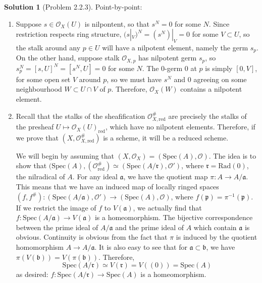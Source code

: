\documentclass[aps,pra,showpacs,notitlepage,onecolumn,superscriptaddress,nofootinbib]{revtex4-1}
\theoremstyle{definition}
\newtheorem{solution}{Solution}[section]
\begin{document}
\begin{solution}[Problem 2.2.3]
  Point-by-point:
  \begin{enumerate}
    \item Suppose $s \in \mathcal{O}_X(U)$ is nilpontent, so that $s^N = 0$ for some $N$. Since restriction respects ring structure, $(s|_V)^N = (s^N)|_V = 0$ for some $V \subset U$,
      so the stalk around any $p \in U$ will have a nilpotent element, namely the germ $s_p$. On the other hand, suppose stalk $\mathcal{O}_{X, p}$ has nilpotent germ $s_p$, so
      $s_p^N = [s, U]^N = [s^N, U] = 0$ for some $N$. The $0$-germ $0$ at $p$ is simply $[0, V]$, for some open set $V$ around $p$, so we must have $s^N$ and $0$ agreeing on some neighbourhood
      $W \subset U \cap V$ of $p$. Therefore, $\mathcal{O}_X(W)$ contains a nilpotent element.
      \item Recall that the stalks of the sheafification $\mathcal{O}_{X, \text{red}}^{\#}$ are precisely the stalks of the presheaf $U \mapsto \mathcal{O}_X(U)_{\text{red}}$, which have no nilpotent elements.
        Therefore, if we prove that $(X, \mathcal{O}_{X, \text{red}}^{\#})$ is a scheme, it will be a reduced scheme.

        We will begin by assuming that $(X, \mathcal{O}_X) = (\text{Spec}(A), \mathcal{O})$.
        The idea is to show that $(\text{Spec}(A), (\mathcal{O}_{\text{red}}^{\#}) \simeq (\text{Spec}(A/\mathfrak{r}), \mathcal{O}')$, where $\mathfrak{r} = \text{Rad}(0)$, the nilradical of $A$. For any
        ideal $\mathfrak{a}$, we have the quotient map $\pi : A \rightarrow A/\mathfrak{a}$. This means that we have an induced map of locally ringed spaces
        $(f, f^{\#}) : (\text{Spec}(A/\mathfrak{a}), \mathcal{O}') \rightarrow (\text{Spec}(A), \mathcal{O})$, where $f(\mathfrak{p}) = \pi^{-1}(\mathfrak{p})$. If we restrict the image
        of $f$ to $V(\mathfrak{a})$, we actually find that $f : \text{Spec}(A/\mathfrak{a}) \rightarrow V(\mathfrak{a})$ is a homeomorphism. The bijective correspondence between the prime ideal of $A/\mathfrak{a}$ and the prime
        ideal of $A$ which contain $\mathfrak{a}$ is obvious. Continuity is obvious from the fact that $\pi$ is induced by the quotient homomorphism $A \rightarrow A/\mathfrak{a}$. It is also easy to see that
        for $\mathfrak{a} \subset \mathfrak{b}$, we have $\pi(V(\mathfrak{b})) = V(\pi(\mathfrak{b}))$. Therefore,
        \begin{equation}
        \text{Spec}(A/\mathfrak{r}) \simeq V(\mathfrak{r}) = V((0)) = \text{Spec}(A)
        \end{equation}
        as desired: $f : \text{Spec}(A/\mathfrak{r}) \rightarrow \text{Spec}(A)$ is a homeomorphism.


\end{enumerate}
\end{solution}
\end{document}
